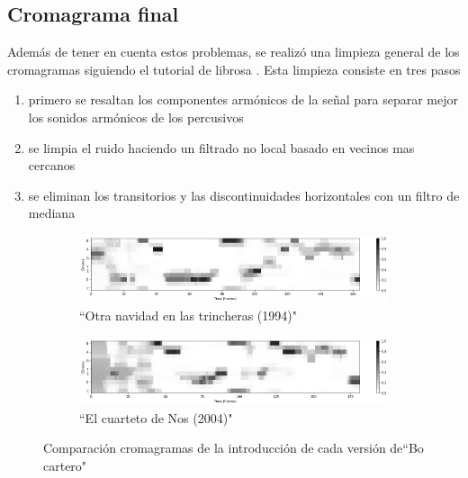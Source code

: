 \documentclass{article}
\begin{document}
\subsection{Cromagrama final}

Además de tener en cuenta estos problemas, se realizó una limpieza general de los cromagramas siguiendo el tutorial de librosa \cite{Librosa}. Esta limpieza consiste en tres pasos
\begin{enumerate}
    \item primero se resaltan los componentes armónicos de la señal para separar mejor los sonidos armónicos de los percusivos
    \item se limpia el ruido haciendo un filtrado no local basado en vecinos mas cercanos
    \item se eliminan los transitorios y las discontinuidades horizontales con un filtro de mediana
\end{enumerate}

\begin{figure}[!h]
\centering
\begin{subfigure}{\textwidth}
    \includegraphics[width=\textwidth]{chromas/bo_cartero_1.png}
    \caption{``Otra navidad en las trincheras (1994)"}
    \label{bo_cartero1}
\end{subfigure}
\vfill
\begin{subfigure}{\textwidth}
    \includegraphics[width=\textwidth]{chromas/bo_cartero_2.png}
    \caption{``El cuarteto de Nos (2004)"}
    \label{bo_cartero2}
\end{subfigure}
\caption{Comparación cromagramas de la introducción de cada versión de``Bo cartero"}
\label{bo_cartero}
\end{figure}
\end{document}
